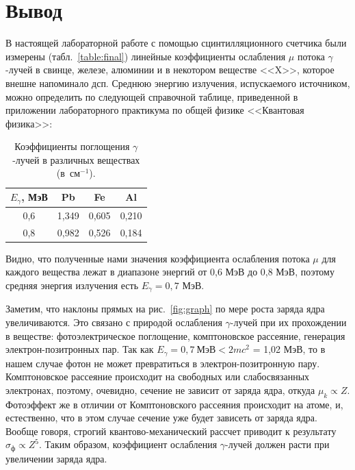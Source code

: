 \documentclass[a4paper, 12pt]{article}%
\begin{document}
\section{Вывод}
	В настоящей лабораторной работе с помощью сцинтилляционного счетчика были измерены (табл.~\ref{table:final}) линейные коэффициенты ослабления $\mu$ потока $\gamma$-лучей в свинце, железе, алюминии и в некотором веществе <<X>>, которое внешне напоминало дсп. Среднюю энергию излучения, испускаемого источником, можно определить по следующей справочной таблице, приведенной в приложении лабораторного практикума по общей физике <<Квантовая физика>>:
	\begin{table}[!h]
	\begin{center}
		\caption{Коэффициенты поглощения $\gamma$-лучей в различных веществах (в~см$^{-1}$).}
		\label{table:spravocka}
		\begin{tabular}{|c|c|c|c|}
			\hline
			$E_\gamma$, МэВ & Pb    & Fe    & Al    \\ \hline
			0,6             & 1,349 & 0,605 & 0,210 \\ \hline
			0,8             & 0,982 & 0,526 & 0,184 \\ \hline
		\end{tabular}
	\end{center}
	\end{table}

	Видно, что полученные нами значения коэффициента ослабления потока $\mu$ для каждого вещества лежат в диапазоне энергий от 0,6 МэВ до 0,8 МэВ, поэтому средняя энергия излучения есть $E_\gamma = 0,7$ МэВ.
	
	Заметим, что наклоны прямых на рис.~\ref{fig:graph} по мере роста заряда ядра увеличиваются. Это связано с природой ослабления $\gamma$-лучей при их прохождении в веществе: фотоэлектрическое поглощение, комптоновское рассеяние, генерация электрон-позитронных пар. Так как $E_\gamma = 0,7 \ \text{МэВ} < 2mc^2$ = 1,02 МэВ, то в нашем случае фотон не может превратиться в электрон-позитронную пару. Комптоновское рассеяние происходит на свободных или слабосвязанных электронах, поэтому, очевидно, сечение не зависит от заряда ядра, откуда $\mu_k \propto Z$. Фотоэффект же в отличии от Комптоновского рассеяния происходит на атоме, и, естественно, что в этом случае сечение уже будет зависеть от заряда ядра. Вообще говоря, строгий квантово-механический рассчет приводит к результату $\sigma_\text{ф} \propto Z^5$. Таким образом, коэффициент ослабления $\gamma$-лучей должен расти при увеличении заряда ядра. 
	

	
\end{document}
